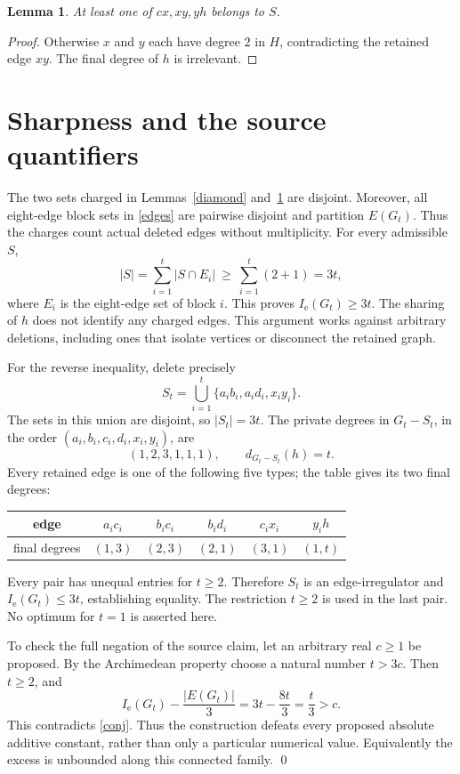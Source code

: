 \documentclass[11pt]{article}
\newtheorem{lemma}{Lemma}
\newcommand{\Ie}{I_{\mathrm e}}
\begin{document}
\begin{lemma}\label{path}
At least one of $cx,xy,yh$ belongs to $S$.
\end{lemma}
\begin{proof}
Otherwise $x$ and $y$ each have degree $2$ in $H$, contradicting the retained
edge $xy$. The final degree of $h$ is irrelevant.
\end{proof}

\newpage
\section{Sharpness and the source quantifiers}
The two sets charged in Lemmas~\ref{diamond} and~\ref{path} are disjoint.
Moreover, all eight-edge block sets in \eqref{edges} are pairwise disjoint
and partition $E(G_t)$. Thus the charges count actual deleted edges without
multiplicity. For every admissible $S$,
\[
 |S|=\sum_{i=1}^t |S\cap E_i|\ \ge\ \sum_{i=1}^t(2+1)=3t,
\]
where $E_i$ is the eight-edge set of block $i$. This proves
$\Ie(G_t)\ge3t$. The sharing of $h$ does not identify any charged edges.
This argument works against arbitrary deletions, including ones that
isolate vertices or disconnect the retained graph.

For the reverse inequality, delete precisely
\[
 S_t=\bigcup_{i=1}^t\{a_i b_i,a_i d_i,x_i y_i\}.
\]
The sets in this union are disjoint, so $|S_t|=3t$. The private degrees in
$G_t-S_t$, in the order $(a_i,b_i,c_i,d_i,x_i,y_i)$, are
\[
 (1,2,3,1,1,1),\qquad d_{G_t-S_t}(h)=t.
\]
Every retained edge is one of the following five types; the table gives
its two final degrees:
\begin{center}
\begin{tabular}{c|ccccc}
edge & $a_ic_i$ & $b_ic_i$ & $b_id_i$ & $c_ix_i$ & $y_ih$\\\hline
final degrees & $(1,3)$ & $(2,3)$ & $(2,1)$ & $(3,1)$ & $(1,t)$
\end{tabular}
\end{center}
Every pair has unequal entries for $t\ge2$. Therefore $S_t$ is an
edge-irregulator and $\Ie(G_t)\le3t$, establishing equality.
The restriction $t\ge2$ is used in the last pair. No optimum for $t=1$
is asserted here.

To check the full negation of the source claim, let an arbitrary real
$c\ge1$ be proposed. By the Archimedean property choose a natural number
$t>3c$. Then $t\ge2$, and
\[
 \Ie(G_t)-\frac{|E(G_t)|}{3}
   =3t-\frac{8t}{3}=\frac{t}{3}>c.
\]
This contradicts \eqref{conj}. Thus the construction defeats every proposed
absolute additive constant, rather than only a particular numerical value.
Equivalently the excess is unbounded along this connected family.
\qed
\end{document}
